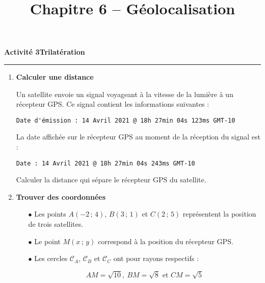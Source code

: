 \documentclass[a4paper]{article}
\begin{document}
\title{Chapitre 6 -- Géolocalisation}

\pagestyle{empty}

\date{}
\author{}

\maketitle{}

\thispagestyle{empty}
\noindent\textbf{Activité 3}\hfill{}\textbf{Trilatération}
\smallskip
\hrule
\medskip

\begin{enumerate}
  \item \textbf{Calculer une distance} 

    Un satellite envoie un signal voyageant à la vitesse de la lumière à un récepteur GPS. Ce signal contient les informations suivantes : 
    \begin{center}
      \verb|Date d'émission : 14 Avril 2021 @ 18h 27min 04s 123ms GMT-10|
    \end{center}

    La date affichée sur le récepteur GPS au moment de la réception du signal est : 
    \begin{center}
      \verb|Date : 14 Avril 2021 @ 18h 27min 04s 243ms GMT-10|
    \end{center}

    Calculer la distance qui sépare le récepteur GPS du satellite.


  \item \textbf{Trouver des coordonnées}
    \begin{itemize}
      \item[$\bullet$] Les points $A(-2\,;\,4)$, $B(3\,;\,1)$ et $C(2\,;\,5)$ représentent la position de trois satellites. 
      \item[$\bullet$] Le point $M(x\,;\,y)$ correspond à la position du récepteur GPS. 
      \item[$\bullet$] Les cercles $\mathcal{C}_A$, $\mathcal{C}_B$ et $\mathcal{C}_C$ ont pour rayons respectifs :

	\[AM = \sqrt{10},\ BM = \sqrt{8} \mbox{ et } CM = \sqrt{5}\]


\end{itemize}
\end{enumerate}
\end{document}
